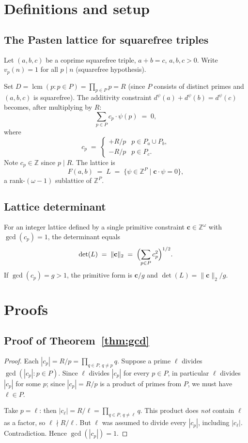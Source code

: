 \documentclass[12pt]{article}
\theoremstyle{definition}
\DeclareMathOperator{\lcm}{lcm}
\begin{document}
\section{Definitions and setup}

\subsection{The Pasten lattice for squarefree triples}

Let $(a,b,c)$ be a coprime squarefree triple, $a+b=c$, $a,b,c>0$.
Write $v_p(n)=1$ for all $p \mid n$ (squarefree hypothesis).

Set $D = \lcm(p : p \in P) = \prod_{p \in P} p = R$ (since $P$ consists of
distinct primes and $(a,b,c)$ is squarefree).  The additivity constraint
$d^\psi(a)+d^\psi(b)=d^\psi(c)$ becomes, after multiplying by $R$:
\[
  \sum_{p \in P} c_p \cdot \psi(p) \;=\; 0,
\]
where
\[
  c_p \;=\; \begin{cases}
    +R/p & p \in P_a \cup P_b, \\
    -R/p & p \in P_c.
  \end{cases}
\]
Note $c_p \in \mathbb{Z}$ since $p \mid R$.  The lattice is
\[
  F(a,b) \;=\; L \;=\;
  \bigl\{ \psi \in \mathbb{Z}^P \;\big|\; \mathbf{c} \cdot \psi = 0 \bigr\},
\]
a rank-$(\omega-1)$ sublattice of $\mathbb{Z}^P$.

\subsection{Lattice determinant}

For an integer lattice defined by a single primitive constraint
$\mathbf{c} \in \mathbb{Z}^\omega$ with $\gcd(c_p)=1$, the determinant equals
\[
  \det(L) \;=\; \|\mathbf{c}\|_2
    \;=\; \Bigl(\sum_{p \in P} c_p^2\Bigr)^{1/2}.
\]
If $\gcd(c_p) = g > 1$, the primitive form is $\mathbf{c}/g$ and
$\det(L) = \|\mathbf{c}\|_2 / g$.

\section{Proofs}

\subsection{Proof of Theorem~\ref{thm:gcd}}

\begin{proof}
Each $|c_p| = R/p = \prod_{q \in P,\, q \ne p} q$.
Suppose a prime $\ell$ divides $\gcd(|c_p| : p \in P)$.
Since $\ell$ divides $|c_p|$ for every $p \in P$, in particular $\ell$ divides
$|c_p|$ for some $p$; since $|c_p| = R/p$ is a product of primes from $P$,
we must have $\ell \in P$.

Take $p = \ell$: then $|c_\ell| = R/\ell = \prod_{q \in P,\, q \ne \ell} q$.
This product does \emph{not} contain $\ell$ as a factor, so $\ell \nmid R/\ell$.
But $\ell$ was assumed to divide every $|c_p|$, including $|c_\ell|$.
Contradiction.  Hence $\gcd(|c_p|) = 1$.
\end{proof}
\end{document}
